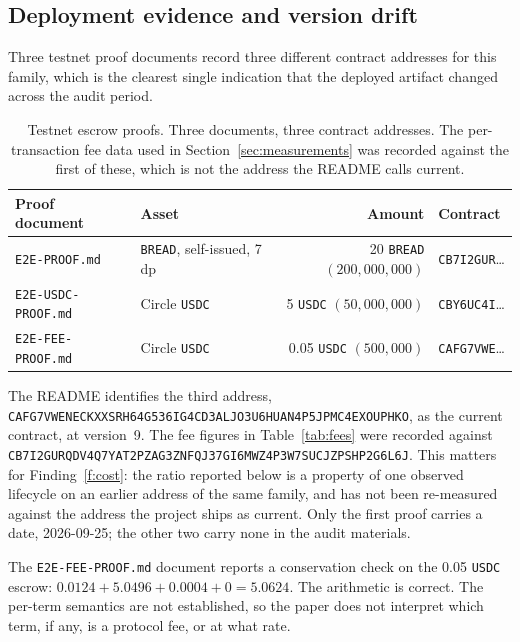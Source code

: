 \documentclass[sigconf,review]{acmart}
\begin{document}
\subsection{Deployment evidence and version drift}

Three testnet proof documents record three different contract addresses for
this family, which is the clearest single indication that the deployed artifact
changed across the audit period.

\begin{table}[t]
\caption{Testnet escrow proofs. Three documents, three contract addresses. The
per-transaction fee data used in Section~\ref{sec:measurements} was recorded
against the first of these, which is not the address the README calls current.}
\label{tab:proofs}
\small
\begin{tabular}{@{}llrl@{}}
\toprule
Proof document & Asset & Amount & Contract \\
\midrule
\texttt{E2E-PROOF.md} &
  \texttt{BREAD}, self-issued, 7 dp &
  20 \texttt{BREAD} \newline $(200{,}000{,}000)$ &
  \texttt{CB7I2GUR}\dots \\
\texttt{E2E-USDC-PROOF.md} &
  Circle \texttt{USDC} &
  5 \texttt{USDC} \newline $(50{,}000{,}000)$ &
  \texttt{CBY6UC4I}\dots \\
\texttt{E2E-FEE-PROOF.md} &
  Circle \texttt{USDC} &
  0.05 \texttt{USDC} \newline $(500{,}000)$ &
  \texttt{CAFG7VWE}\dots \\
\bottomrule
\end{tabular}
\end{table}

The README identifies the third address, \texttt{CAFG7VWENECKXXS\allowbreak RH64G536IG4CD3\allowbreak ALJO3U6HUAN4P5\allowbreak JPMC4EXOUPHKO},
as the current contract, at version~9. The fee figures in
Table~\ref{tab:fees} were recorded against
\texttt{CB7I2GURQDV4Q7\allowbreak YAT2PZAG3ZNFQJ\allowbreak 37GI6MWZ4P3W7\allowbreak SUCJZPSHP2G6L6J}. This
matters for Finding~\ref{f:cost}: the ratio reported below is a property of one
observed lifecycle on an earlier address of the same family, and has not been
re-measured against the address the project ships as current. Only the first
proof carries a date, 2026-09-25; the other two carry none in the audit
materials.

The \texttt{E2E-FEE-PROOF.md} document reports a conservation check on the
0.05 \texttt{USDC} escrow: $0.0124 + 5.0496 + 0.0004 + 0 = 5.0624$. The
arithmetic is correct. The per-term semantics are not established, so the paper
does not interpret which term, if any, is a protocol fee, or at what rate.
\end{document}
